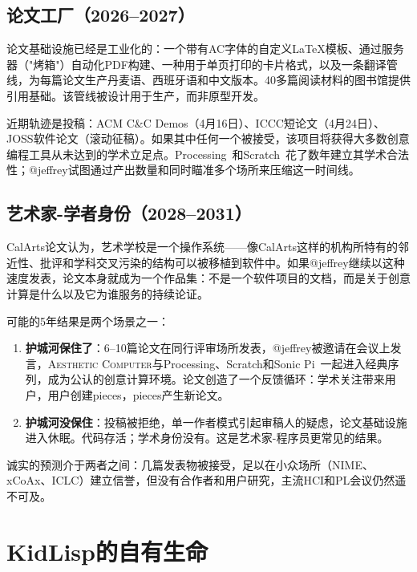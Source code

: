 \documentclass[10pt,letterpaper,twocolumn]{article}
\newcommand{\ac}{\textsc{Aesthetic Computer}}
\begin{document}
\subsection{论文工厂（2026--2027）}

论文基础设施已经是工业化的：一个带有AC字体的自定义\LaTeX{}模板、通过服务器（"烤箱"）自动化PDF构建、一种用于单页打印的卡片格式，以及一条翻译管线，为每篇论文生产丹麦语、西班牙语和中文版本。40多篇阅读材料的图书馆提供引用基础。该管线被设计用于生产，而非原型开发。

近期轨迹是投稿：ACM C\&C Demos（4月16日）、ICCC短论文（4月24日）、JOSS软件论文（滚动征稿）。如果其中任何一个被接受，该项目将获得大多数创意编程工具从未达到的学术立足点。Processing~\citep{reas2007processing}和Scratch~\citep{resnick2009scratch}花了数年建立其学术合法性；@jeffrey试图通过产出数量和同时瞄准多个场所来压缩这一时间线。

\subsection{艺术家-学者身份（2028--2031）}

CalArts论文认为，艺术学校是一个操作系统——像CalArts这样的机构所特有的邻近性、批评和学科交叉污染的结构可以被移植到软件中。如果@jeffrey继续以这种速度发表，论文本身就成为一个作品集：不是一个软件项目的文档，而是关于创意计算是什么以及它为谁服务的持续论证。

可能的5年结果是两个场景之一：

\begin{enumerate}
  \item \textbf{护城河保住了}：6--10篇论文在同行评审场所发表，@jeffrey被邀请在会议上发言，\ac{}与Processing、Scratch和Sonic Pi~\citep{aaron2016sonic}一起进入经典序列，成为公认的创意计算环境。论文创造了一个反馈循环：学术关注带来用户，用户创建pieces，pieces产生新论文。
  \item \textbf{护城河没保住}：投稿被拒绝，单一作者模式引起审稿人的疑虑，论文基础设施进入休眠。代码存活；学术身份没有。这是艺术家-程序员更常见的结果。
\end{enumerate}

诚实的预测介于两者之间：几篇发表物被接受，足以在小众场所（NIME、xCoAx、ICLC）建立信誉，但没有合作者和用户研究，主流HCI和PL会议仍然遥不可及。


\section{KidLisp的自有生命}
\label{sec:kidlisp}
\end{document}

